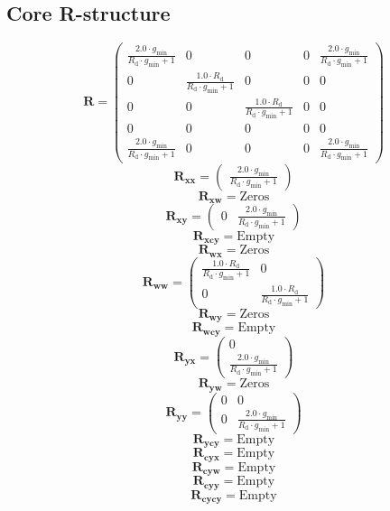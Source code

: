 \documentclass[11pt, oneside]{article}      %
\begin{document}
\subsection{Core R-structure}
%
$$ \mathbf{R} = \left(\begin{array}{ccccc}\frac{2.0 \cdot g_{\mathrm{min}}}{R_{\mathrm{d}} \cdot g_{\mathrm{min}} + 1} & 0 & 0 & 0 & \frac{2.0 \cdot g_{\mathrm{min}}}{R_{\mathrm{d}} \cdot g_{\mathrm{min}} + 1}\\0 & \frac{1.0 \cdot R_{\mathrm{d}}}{R_{\mathrm{d}} \cdot g_{\mathrm{min}} + 1} & 0 & 0 & 0\\0 & 0 & \frac{1.0 \cdot R_{\mathrm{d}}}{R_{\mathrm{d}} \cdot g_{\mathrm{min}} + 1} & 0 & 0\\0 & 0 & 0 & 0 & 0\\\frac{2.0 \cdot g_{\mathrm{min}}}{R_{\mathrm{d}} \cdot g_{\mathrm{min}} + 1} & 0 & 0 & 0 & \frac{2.0 \cdot g_{\mathrm{min}}}{R_{\mathrm{d}} \cdot g_{\mathrm{min}} + 1}\end{array}\right)$$
%
$$ \mathbf{R_{xx}} = \left(\begin{array}{c}\frac{2.0 \cdot g_{\mathrm{min}}}{R_{\mathrm{d}} \cdot g_{\mathrm{min}} + 1}\end{array}\right)$$
%
$$ \mathbf{R_{xw}} = \mathrm{Zeros}$$
%
$$ \mathbf{R_{xy}} = \left(\begin{array}{cc}0 & \frac{2.0 \cdot g_{\mathrm{min}}}{R_{\mathrm{d}} \cdot g_{\mathrm{min}} + 1}\end{array}\right)$$
%
$$ \mathbf{R_{xcy}} = \mathrm{Empty}$$
%
$$ \mathbf{R_{wx}} = \mathrm{Zeros}$$
%
$$ \mathbf{R_{ww}} = \left(\begin{array}{cc}\frac{1.0 \cdot R_{\mathrm{d}}}{R_{\mathrm{d}} \cdot g_{\mathrm{min}} + 1} & 0\\0 & \frac{1.0 \cdot R_{\mathrm{d}}}{R_{\mathrm{d}} \cdot g_{\mathrm{min}} + 1}\end{array}\right)$$
%
$$ \mathbf{R_{wy}} = \mathrm{Zeros}$$
%
$$ \mathbf{R_{wcy}} = \mathrm{Empty}$$
%
$$ \mathbf{R_{yx}} = \left(\begin{array}{c}0\\\frac{2.0 \cdot g_{\mathrm{min}}}{R_{\mathrm{d}} \cdot g_{\mathrm{min}} + 1}\end{array}\right)$$
%
$$ \mathbf{R_{yw}} = \mathrm{Zeros}$$
%
$$ \mathbf{R_{yy}} = \left(\begin{array}{cc}0 & 0\\0 & \frac{2.0 \cdot g_{\mathrm{min}}}{R_{\mathrm{d}} \cdot g_{\mathrm{min}} + 1}\end{array}\right)$$
%
$$ \mathbf{R_{ycy}} = \mathrm{Empty}$$
%
$$ \mathbf{R_{cyx}} = \mathrm{Empty}$$
%
$$ \mathbf{R_{cyw}} = \mathrm{Empty}$$
%
$$ \mathbf{R_{cyy}} = \mathrm{Empty}$$
%
$$ \mathbf{R_{cycy}} = \mathrm{Empty}$$
%

%
\end{document}
